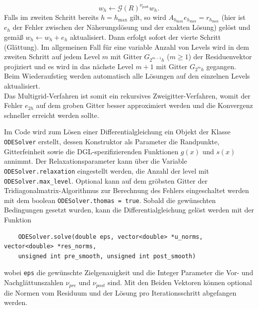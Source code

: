 \documentclass[11pt,a4paper]{article}
\begin{document}
\begin{equation*}
    w_h \leftarrow \mathcal{G}(R)^{\nu_{\mathrm{post}}} w_h .
\end{equation*} Falls im zweiten Schritt bereits $h = h_{\mathrm{max}}$ gilt, so wird $A_{h_{\mathrm{max}}} e_{h_{\mathrm{max}}} = r_{h_{\mathrm{max}}}$ (hier ist $e_h$ der Fehler zwischen der Näherungslösung und der exakten Lösung) gelöst und gemäß $w_h \leftarrow w_h + e_h$ aktualisiert. Dann erfolgt sofort der vierte Schritt (Glättung).
Im allgemeinen Fall für eine variable Anzahl von Levels wird in dem zweiten Schritt auf jedem Level $m$ mit Gitter $G_{2^{m-1}h}$ ($m \geq 1$) der Residuenvektor projiziert und es wird in das nächste Level
$m+1$ mit Gitter $G_{2^m h}$ gegangen. Beim Wiederaufstieg werden automatisch alle Lösungen auf den einzelnen Levels aktualisiert.\\
Das Multigrid-Verfahren ist somit ein rekursives Zweigitter-Verfahren, womit der Fehler $e_{2h}$ auf dem groben Gitter besser approximiert werden und die Konvergenz schneller erreicht werden sollte.\\\par
Im Code wird zum Lösen einer Differentialgleichung ein Objekt der Klasse \verb|ODESolver| erstellt, dessen Konstruktor als Parameter die Randpunkte, Gitterfeinheit sowie die 
DGL-spezifizierenden Funktionen $g(x)$ und $s(x)$ annimmt.  Der Relaxationsparameter kann über die Variable \verb|ODESolver.relaxation| eingestellt werden, die Anzahl der 
level mit \verb|ODESolver.max_level|. Optional kann auf dem gröbsten Gitter der Tridiagonalmatrix-Algorithmus zur Berechnung des Fehlers eingeschaltet werden mit dem boolean 
\verb|ODESolver.thomas = true|. Sobald die gewünschten Bedingungen gesetzt wurden, kann die Differentialgleichung gelöst werden mit der Funktion 
\begin{verbatim}
    ODESolver.solve(double eps, vector<double> *u_norms, vector<double> *res_norms, 
    unsigned int pre_smooth, unsigned int post_smooth)
\end{verbatim}
wobei \verb|eps| die gewünschte Zielgenauigkeit und die Integer Parameter die Vor- und Nachglättunszahlen $\nu_{pre}$ und $\nu_{post}$ sind. Mit den Beiden Vektoren können optional 
die Normen vom Residuum und der Lösung pro Iterationsschritt abgefangen werden.\newpage
\end{document}
